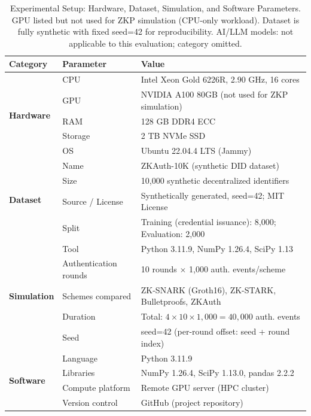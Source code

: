 \documentclass[journal,12pt,onecolumn]{IEEEtran}
\begin{document}
\begin{table}[t]
\caption{Experimental Setup: Hardware, Dataset, Simulation, and Software
Parameters. GPU listed but not used for ZKP simulation (CPU-only workload).
Dataset is fully synthetic with fixed seed=42 for reproducibility.
AI/LLM models: not applicable to this evaluation; category omitted.}
\label{tab:setup}
\begin{tabularx}{\textwidth}{l l X}
\toprule
\textbf{Category} & \textbf{Parameter} & \textbf{Value} \\
\midrule
\multirow{5}{*}{\textbf{Hardware}}
  & CPU    & Intel Xeon Gold 6226R, 2.90 GHz, 16 cores \\
  & GPU    & NVIDIA A100 80GB (not used for ZKP simulation) \\
  & RAM    & 128 GB DDR4 ECC \\
  & Storage & 2 TB NVMe SSD \\
  & OS     & Ubuntu 22.04.4 LTS (Jammy) \\
\midrule
\multirow{4}{*}{\textbf{Dataset}}
  & Name          & ZKAuth-10K (synthetic DID dataset) \\
  & Size          & 10,000 synthetic decentralized identifiers \\
  & Source / License & Synthetically generated, seed=42; MIT License \\
  & Split         & Training (credential issuance): 8,000; Evaluation: 2,000 \\
\midrule
\multirow{5}{*}{\textbf{Simulation}}
  & Tool          & Python 3.11.9, NumPy 1.26.4, SciPy 1.13 \\
  & Authentication rounds & 10 rounds $\times$ 1,000 auth. events/scheme \\
  & Schemes compared & ZK-SNARK (Groth16), ZK-STARK, Bulletproofs, ZKAuth \\
  & Duration      & Total: $4 \times 10 \times 1{,}000 = 40{,}000$ auth. events \\
  & Seed          & seed=42 (per-round offset: seed + round index) \\
\midrule
\multirow{4}{*}{\textbf{Software}}
  & Language      & Python 3.11.9 \\
  & Libraries     & NumPy 1.26.4, SciPy 1.13.0, pandas 2.2.2 \\
  & Compute platform & Remote GPU server (HPC cluster) \\
  & Version control & GitHub (project repository) \\
\bottomrule
\end{tabularx}
\end{table}
\end{document}
